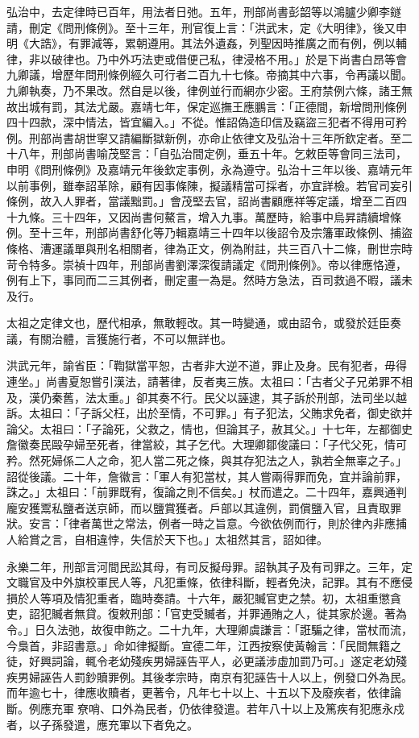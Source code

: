 弘治中，去定律時已百年，用法者日弛。五年，刑部尚書彭韶等以鴻臚少卿李鐩請，刪定《問刑條例》。至十三年，刑官復上言：「洪武末，定《大明律》，後又申明《大誥》，有罪減等，累朝遵用。其法外遺姦，列聖因時推廣之而有例，例以輔律，非以破律也。乃中外巧法吏或借便己私，律浸格不用。」於是下尚書白昂等會九卿議，增歷年問刑條例經久可行者二百九十七條。帝摘其中六事，令再議以聞。九卿執奏，乃不果改。然自是以後，律例並行而網亦少密。王府禁例六條，諸王無故出城有罰，其法尤嚴。嘉靖七年，保定巡撫王應鵬言：「正德間，新增問刑條例四十四款，深中情法，皆宜編入。」不從。惟詔偽造印信及竊盜三犯者不得用可矜例。刑部尚書胡世寧又請編斷獄新例，亦命止依律文及弘治十三年所欽定者。至二十八年，刑部尚書喻茂堅言：「自弘治間定例，垂五十年。乞敕臣等會同三法司，申明《問刑條例》及嘉靖元年後欽定事例，永為遵守。弘治十三年以後、嘉靖元年以前事例，雖奉詔革除，顧有因事條陳，擬議精當可採者，亦宜詳檢。若官司妄引條例，故入人罪者，當議黜罰。」會茂堅去官，詔尚書顧應祥等定議，增至二百四十九條。三十四年，又因尚書何鰲言，增入九事。萬歷時，給事中烏昇請續增條例。至十三年，刑部尚書舒化等乃輯嘉靖三十四年以後詔令及宗籓軍政條例、捕盜條格、漕運議單與刑名相關者，律為正文，例為附註，共三百八十二條，刪世宗時苛令特多。崇禎十四年，刑部尚書劉澤深復請議定《問刑條例》。帝以律應恪遵，例有上下，事同而二三其例者，刪定畫一為是。然時方急法，百司救過不暇，議未及行。

太祖之定律文也，歷代相承，無敢輕改。其一時變通，或由詔令，或發於廷臣奏議，有關治體，言獲施行者，不可以無詳也。

洪武元年，諭省臣：「鞫獄當平恕，古者非大逆不道，罪止及身。民有犯者，毋得連坐。」尚書夏恕嘗引漢法，請著律，反者夷三族。太祖曰：「古者父子兄弟罪不相及，漢仍秦舊，法太重。」卻其奏不行。民父以誣逮，其子訴於刑部，法司坐以越訴。太祖曰：「子訴父枉，出於至情，不可罪。」有子犯法，父賄求免者，御史欲并論父。太祖曰：「子論死，父救之，情也，但論其子，赦其父。」十七年，左都御史詹徽奏民毆孕婦至死者，律當絞，其子乞代。大理卿鄒俊議曰：「子代父死，情可矜。然死婦係二人之命，犯人當二死之條，與其存犯法之人，孰若全無辜之子。」詔從後議。二十年，詹徽言：「軍人有犯當杖，其人嘗兩得罪而免，宜并論前罪，誅之。」太祖曰：「前罪既宥，復論之則不信矣。」杖而遣之。二十四年，嘉興通判龐安獲鬻私鹽者送京師，而以鹽賞獲者。戶部以其違例，罰償鹽入官，且責取罪狀。安言：「律者萬世之常法，例者一時之旨意。今欲依例而行，則於律內非應捕人給賞之言，自相違悖，失信於天下也。」太祖然其言，詔如律。

永樂二年，刑部言河間民訟其母，有司反擬母罪。詔執其子及有司罪之。三年，定文職官及中外旗校軍民人等，凡犯重條，依律科斷，輕者免決，記罪。其有不應侵損於人等項及情犯重者，臨時奏請。十六年，嚴犯贓官吏之禁。初，太祖重懲貪吏，詔犯贓者無貸。復敕刑部：「官吏受贓者，并罪通賄之人，徙其家於邊。著為令。」日久法弛，故復申飭之。二十九年，大理卿虞謙言：「誑騙之律，當杖而流，今梟首，非詔書意。」命如律擬斷。宣德二年，江西按察使黃翰言：「民間無籍之徒，好興詞論，輒令老幼殘疾男婦誣告平人，必更議涉虛加罰乃可。」遂定老幼殘疾男婦誣告人罰鈔贖罪例。其後孝宗時，南京有犯誣告十人以上，例發口外為民。而年逾七十，律應收贖者，更著令，凡年七十以上、十五以下及廢疾者，依律論斷。例應充軍尞哨、口外為民者，仍依律發遣。若年八十以上及篤疾有犯應永戍者，以子孫發遣，應充軍以下者免之。

